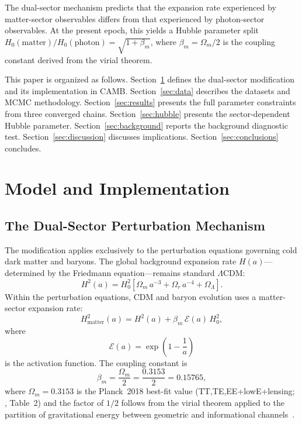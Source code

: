 \documentclass[11pt]{article}
\begin{document}
The dual-sector mechanism predicts that the
expansion rate experienced by matter-sector observables differs from that
experienced by photon-sector observables.  At the present epoch, this
yields a Hubble parameter split
$H_0(\mathrm{matter}) / H_0(\mathrm{photon}) = \sqrt{1 + \beta_m}$,
where $\beta_m = \Omega_m/2$ is the coupling constant derived from the
virial theorem.

This paper is organized as follows.
Section~\ref{sec:model} defines the dual-sector modification and its
implementation in CAMB.
Section~\ref{sec:data} describes the datasets and MCMC methodology.
Section~\ref{sec:results} presents the full parameter constraints from
three converged chains.
Section~\ref{sec:hubble} presents the sector-dependent Hubble parameter.
Section~\ref{sec:background} reports the background diagnostic test.
Section~\ref{sec:discussion} discusses implications.
Section~\ref{sec:conclusions} concludes.


\section{Model and Implementation}
\label{sec:model}

\subsection{The Dual-Sector Perturbation Mechanism}

The modification applies exclusively to the perturbation equations
governing cold dark matter and baryons.  The global background expansion
rate $H(a)$---determined by the Friedmann equation---remains standard
$\Lambda$CDM:
\begin{equation}
H^2(a) = H_0^2\left[\Omega_m\,a^{-3} + \Omega_r\,a^{-4}
  + \Omega_\Lambda\right].
\label{eq:friedmann}
\end{equation}
Within the perturbation equations, CDM and baryon evolution uses a
matter-sector expansion rate:
\begin{equation}
H^2_\mathrm{matter}(a) = H^2(a)
  + \beta_m\,\mathcal{E}(a)\,H_0^2,
\label{eq:H_matter}
\end{equation}
where
\begin{equation}
\mathcal{E}(a) = \exp\!\left(1 - \frac{1}{a}\right)
\label{eq:activation}
\end{equation}
is the activation function.  The coupling constant is
\begin{equation}
\beta_m = \frac{\Omega_m}{2} = \frac{0.3153}{2} = 0.15765,
\label{eq:beta}
\end{equation}
where $\Omega_m = 0.3153$ is the Planck~2018 best-fit value
(TT,TE,EE+lowE+lensing; \citealt{PlanckCollaboration2020b}, Table~2)
and the factor of $1/2$ follows from the virial theorem applied to the
partition of gravitational energy between geometric and informational
channels~\citep{Mahaffey2026theory}.
\end{document}
